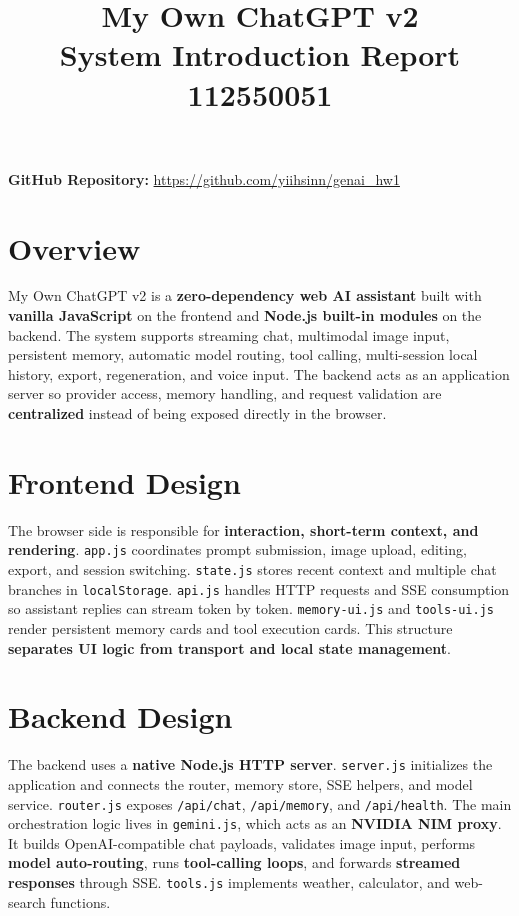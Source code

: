 \documentclass[11pt,a4paper]{article}
\title{\vspace{-1.5cm}\textbf{My Own ChatGPT v2}\\ \vspace{0.5ex} \Large System Introduction Report\\[1ex] \large 112550051}
\author{}
\date{\vspace{-4ex}}
\begin{document}
\maketitle
\thispagestyle{empty}
\vspace{-5ex}
\centerline{\textbf{GitHub Repository:} \url{https://github.com/yiihsinn/genai_hw1}}
\vspace{-3ex}

\section*{Overview}
My Own ChatGPT v2 is a \textbf{zero-dependency web AI assistant} built with \textbf{vanilla JavaScript} on the frontend and \textbf{Node.js built-in modules} on the backend. The system supports streaming chat, multimodal image input, persistent memory, automatic model routing, tool calling, multi-session local history, export, regeneration, and voice input. The backend acts as an application server so provider access, memory handling, and request validation are \textbf{centralized} instead of being exposed directly in the browser.

\section*{Frontend Design}
The browser side is responsible for \textbf{interaction, short-term context, and rendering}. \texttt{app.js} coordinates prompt submission, image upload, editing, export, and session switching. \texttt{state.js} stores recent context and multiple chat branches in \texttt{localStorage}. \texttt{api.js} handles HTTP requests and SSE consumption so assistant replies can stream token by token. \texttt{memory-ui.js} and \texttt{tools-ui.js} render persistent memory cards and tool execution cards. This structure \textbf{separates UI logic from transport and local state management}.

\section*{Backend Design}
The backend uses a \textbf{native Node.js HTTP server}. \texttt{server.js} initializes the application and connects the router, memory store, SSE helpers, and model service. \texttt{router.js} exposes \texttt{/api/chat}, \texttt{/api/memory}, and \texttt{/api/health}. The main orchestration logic lives in \texttt{gemini.js}, which acts as an \textbf{NVIDIA NIM proxy}. It builds OpenAI-compatible chat payloads, validates image input, performs \textbf{model auto-routing}, runs \textbf{tool-calling loops}, and forwards \textbf{streamed responses} through SSE. \texttt{tools.js} implements weather, calculator, and web-search functions.
\end{document}
